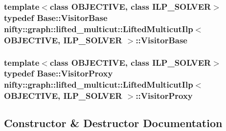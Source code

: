 \subsubsection[{Visitor\+Base}]{\setlength{\rightskip}{0pt plus 5cm}template$<$class O\+B\+J\+E\+C\+T\+I\+V\+E, class I\+L\+P\+\_\+\+S\+O\+L\+V\+E\+R$>$ typedef Base\+::\+Visitor\+Base {\bf nifty\+::graph\+::lifted\+\_\+multicut\+::\+Lifted\+Multicut\+Ilp}$<$ O\+B\+J\+E\+C\+T\+I\+V\+E, I\+L\+P\+\_\+\+S\+O\+L\+V\+E\+R $>$\+::{\bf Visitor\+Base}}\label{classnifty_1_1graph_1_1lifted__multicut_1_1LiftedMulticutIlp_a1bc9b2e1c6bd45ec6d201a8150935edc}
\hypertarget{classnifty_1_1graph_1_1lifted__multicut_1_1LiftedMulticutIlp_ab1f196786ef302060d3dacba919dd60b}{}
\subsubsection[{Visitor\+Proxy}]{\setlength{\rightskip}{0pt plus 5cm}template$<$class O\+B\+J\+E\+C\+T\+I\+V\+E, class I\+L\+P\+\_\+\+S\+O\+L\+V\+E\+R$>$ typedef Base\+::\+Visitor\+Proxy {\bf nifty\+::graph\+::lifted\+\_\+multicut\+::\+Lifted\+Multicut\+Ilp}$<$ O\+B\+J\+E\+C\+T\+I\+V\+E, I\+L\+P\+\_\+\+S\+O\+L\+V\+E\+R $>$\+::{\bf Visitor\+Proxy}}\label{classnifty_1_1graph_1_1lifted__multicut_1_1LiftedMulticutIlp_ab1f196786ef302060d3dacba919dd60b}


\subsection{Constructor \& Destructor Documentation}
\hypertarget{classnifty_1_1graph_1_1lifted__multicut_1_1LiftedMulticutIlp_abd3f0f67ab66073f5cecfe8724ab56e4}{}
